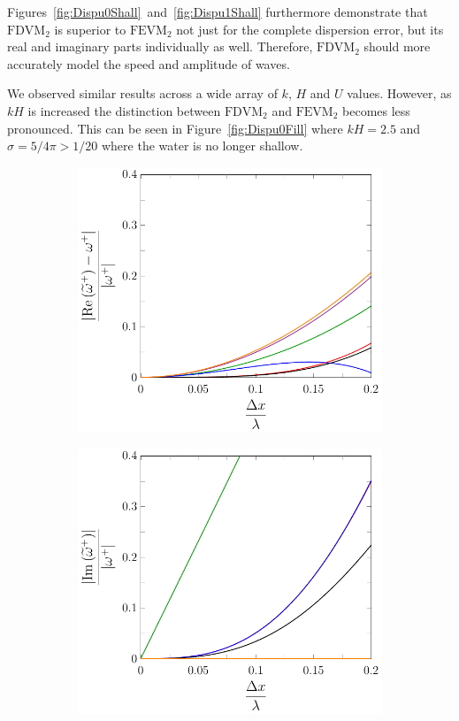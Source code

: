 Figures~\ref{fig:Dispu0Shall}~and~\ref{fig:Dispu1Shall} furthermore demonstrate that $\text{FDVM}_2$ is superior to $\text{FEVM}_2$ not just for the complete dispersion error, but its real and imaginary parts individually as well. Therefore, $\text{FDVM}_2$ should more accurately model the speed and amplitude of waves.

We observed similar results across a wide array of $k$, $H$ and $U$ values. However, as $kH$ is increased the distinction between $\text{FDVM}_2$ and $\text{FEVM}_2$ becomes less pronounced. This can be seen in Figure~\ref{fig:Dispu0Fill} where $kH = 2.5$ and $\sigma = 5/4 \pi > 1/20$ where the water is no longer shallow.
\begin{figure}
	\centering
	\begin{subfigure}{0.5\textwidth}
		\includegraphics[width=\textwidth]{./chp4/figures/New/ReDispu0Fill.pdf}
	\end{subfigure}%
	\begin{subfigure}{0.5\textwidth}
		\includegraphics[width=\textwidth]{./chp4/figures/New/ImDispu0Fill.pdf}

\end{subfigure}
\end{figure}
